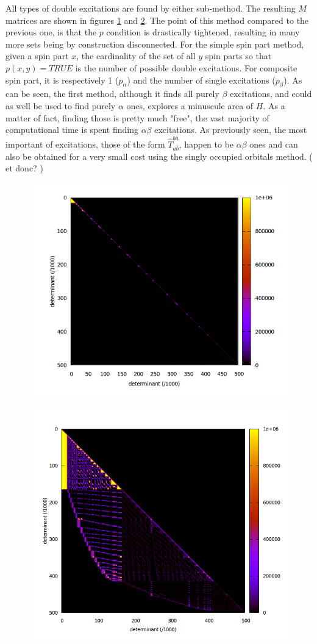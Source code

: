 All types of double excitations are found by either sub-method. The resulting $M$ matrices are shown in figures \ref{fig:aabb_subspace} and \ref{fig:ab_subspace}.
The point of this method compared to the previous one, is that the $p$ condition is drastically tightened, resulting in many more sets being by construction disconnected. For the simple spin part method, given a spin part $x$, the cardinality of the set of all $y$ spin parts so that $p(x, y) = TRUE$ is the number of possible double excitations. For composite spin part, it is respectively 1 ($p_\alpha$) and the number of single excitations ($p_\beta$).
As can be seen, the first method, although it finds all purely $\beta$ excitations, and could as well be used to find purely $\alpha$ ones, explores a minuscule area of $H$. As a matter of fact, finding those is pretty much "free", the vast majority of computational time is spent finding $\alpha \beta$ excitations.
As previously seen, the most important of excitations, those of the form $\hat T_{a \bar b}^{b \bar a}$, happen to be $\alpha \beta$ ones and can also be obtained for a very small cost using the singly occupied orbitals method. ( et donc? )

    
   
\begin{figure}[H]
	\begin{center}
		\includegraphics[width=0.6\columnwidth]{figures/davidson/aabb_subspace}
		\caption{{\label{fig:aabb_subspace}
		}}
	\end{center}
\end{figure}

\begin{figure}[H]
	\begin{center}
		\includegraphics[width=0.55\columnwidth]{figures/davidson/ab_subspace}
		\caption{{\label{fig:ab_subspace}
		}}
	\end{center}
\end{figure}

